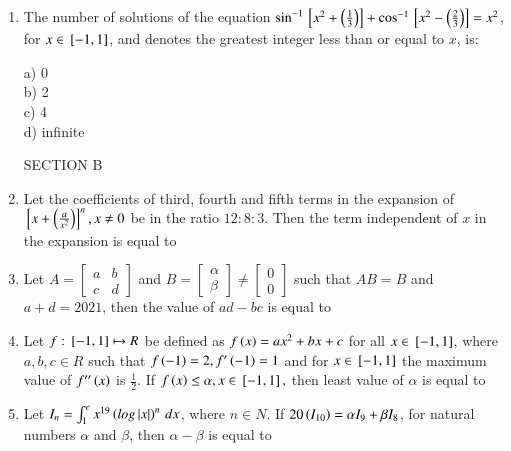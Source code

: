 \documentclass[journal]{IEEEtran}
\begin{document}
\begin{enumerate}
\item The number of solutions of the equation $\sin^{-1}{}\left[x^2+\left(\frac{1}{3}\right)\right]+\cos^{-1}{}\left[x^2-\left(\frac{2}{3}\right)\right]=x^2$, for $x \in {}\left[-1,1\right]$, and  denotes the greatest integer less than or equal to $x$, is:
\begin{multicols}{4}
    a) 0\\
    b) 2\\
    c) 4\\
    d) infinite
\end{multicols}
SECTION B
\item Let the coefficients of third, fourth and fifth terms in the expansion of ${}\left[x+\left(\frac{a}{x^2}\right)\right]^n, x\neq 0$ be in the ratio $12:8:3$. Then the term independent of $x$ in the expansion is equal to 

\item Let $A=\begin{bmatrix}a & b \\ c& d\end{bmatrix}$ and $B=\begin{bmatrix}\alpha \\ \beta\end{bmatrix}\neq \begin{bmatrix}0\\0\end{bmatrix}$ such that $AB=B$ and $a+d=2021$, then the value of $ad-bc$ is equal to 

\item Let $f: {}\left[-1,1\right]\mapsto R$ be defined as $f\left(x\right)=ax^2 +bx+c$ for all $x\in {}\left[-1,1\right]$, where $a,b,c \in R$ such that $f\left(-1\right)=2, f^{\prime}\left(-1\right)=1$ and for $x\in {}\left[-1,1\right]$ the maximum value of $f^{\prime\prime}\left(x\right)$ is $\frac{1}{2}$. If $f\left(x\right)\leq \alpha, x\in {}\left[-1,1\right],$ then least value of $\alpha$ is equal to

\item Let $I_n = 
\int_{1}^{e} x^{19}\left(log\left\vert x\right\vert\right)^n \, dx$, where $n \in N$. If $20\left(I_{10}\right)=\alpha I_9+\beta I_8$, for natural numbers $\alpha$ and $\beta$, then $\alpha-\beta$ is equal to


\end{enumerate}
\end{document}
